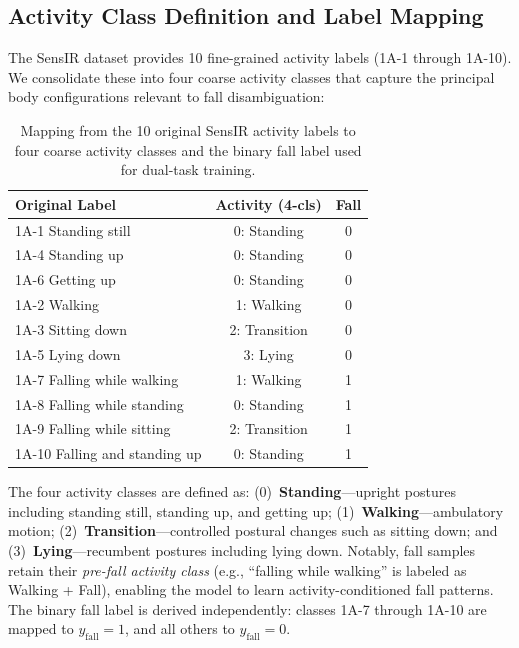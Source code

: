 \subsection{Activity Class Definition and Label Mapping}
\label{subsec:activity_classes}

The SensIR dataset provides 10 fine-grained activity labels (1A-1 through 1A-10). We consolidate these into four coarse activity classes that capture the principal body configurations relevant to fall disambiguation:

\begin{table}[t]
    \centering
    \caption{Mapping from the 10 original SensIR activity labels to four coarse activity classes and the binary fall label used for dual-task training.}
    \label{tab:label_mapping}
    \small
    \begin{tabular}{lcc}
        \hline
        \textbf{Original Label} & \textbf{Activity (4-cls)} & \textbf{Fall} \\
        \hline
        1A-1 Standing still        & 0: Standing  & 0 \\
        1A-4 Standing up           & 0: Standing  & 0 \\
        1A-6 Getting up            & 0: Standing  & 0 \\
        1A-2 Walking               & 1: Walking   & 0 \\
        1A-3 Sitting down          & 2: Transition & 0 \\
        1A-5 Lying down            & 3: Lying     & 0 \\
        \hline
        1A-7 Falling while walking & 1: Walking   & 1 \\
        1A-8 Falling while standing & 0: Standing & 1 \\
        1A-9 Falling while sitting & 2: Transition & 1 \\
        1A-10 Falling and standing up & 0: Standing & 1 \\
        \hline
    \end{tabular}
\end{table}

The four activity classes are defined as: (0)~\textbf{Standing}---upright postures including standing still, standing up, and getting up; (1)~\textbf{Walking}---ambulatory motion; (2)~\textbf{Transition}---controlled postural changes such as sitting down; and (3)~\textbf{Lying}---recumbent postures including lying down. Notably, fall samples retain their \emph{pre-fall activity class} (e.g., ``falling while walking'' is labeled as Walking + Fall), enabling the model to learn activity-conditioned fall patterns. The binary fall label is derived independently: classes 1A-7 through 1A-10 are mapped to $y_\text{fall} = 1$, and all others to $y_\text{fall} = 0$.

